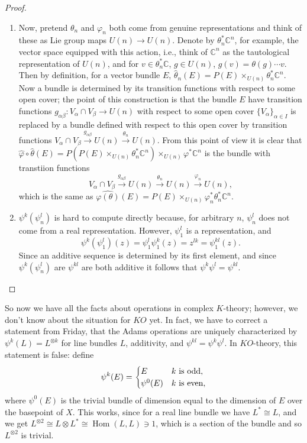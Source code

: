 \documentclass{article}
\newcommand{\C}{\mathbb{C}}
\DeclareMathOperator{\Hom}{Hom}
\begin{document}
\begin{proof}
\begin{enumerate}
\item Now, pretend $\theta_n$ and $\varphi_n$ both come from genuine representations and think of these as Lie group maps $U(n) \to U(n)$.  Denote by $\theta_n^* \C^n$, for example, the vector space equipped with this action, i.e., think of $\C^n$ as the tautological representation of $U(n)$, and for $v \in \theta_n^* \C$, $g \in U(n)$, $g(v) = \theta(g) \cdots v$.  Then by definition, for a vector bundle $E$, $\hat \theta_n(E) = P(E) \times_{U(n)} \theta_n^* \C^n$.  Now a bundle is determined by its transition functions with respect to some open cover; the point of this construction is that the bundle $E$ have transition functions $g_{\alpha \beta}: V_\alpha \cap V_\beta \to U(n)$ with respect to some open cover $\{V_\alpha\}_{\alpha \in I}$ is replaced by a bundle defined with respect to this open cover by transition functions $V_\alpha \cap V_\beta \stackrel{g_{\alpha \beta}}{\to} U(n) \stackrel{\theta_n}{\to} U(n)$.  From this point of view it is clear that $\hat \varphi \circ \hat \theta(E) = P(P(E) \times_{U(n)} \theta^*_n \C^n) \times_{U(n)} \varphi^* \C^n$ is the bundle with transtiion functions \[V_\alpha \cap V_\beta \stackrel{g_{\alpha \beta}}{\to} U(n) \stackrel{\theta_n}{\to} U(n) \stackrel{\varphi_n}{\to} U(n),\] which is the same as $\widehat{\varphi(\theta)} (E) = P(E) \times_{U(n)} \varphi^*_n \theta^*_n \C^n$.
\item $\psi^k(\psi^l_n)$ is hard to compute directly because, for arbitrary $n$, $\psi^l_n$ does not come from a real representation.  However, $\psi^l_1$ is a representation, and \[\psi^k(\psi^l_1)(z) = \psi^l_1 \psi^k_1(z) = z^{lk} = \psi^{kl}_1(z).\]  Since an additive sequence is determined by its first element, and since $\psi^k(\psi^l_n)$ are $\psi^{kl}$ are both additive it follows that $\psi^k \psi^l = \psi^{kl}$.
\end{enumerate}
\end{proof}

So now we have all the facts about operations in complex $K$-theory; however, we don't know about the situation for $KO$ yet.  In fact, we have to correct a statement from Friday, that the Adams operations are uniquely characterized by $\psi^k(L) = L^{\otimes k}$ for line bundles $L$, additivity, and $\psi^{kl} = \psi^k \psi^l$.  In $KO$-theory, this statement is false: define \[\psi^k(E) = \begin{cases} E & \hbox{$k$ is odd}, \\ \psi^0(E) & \hbox{$k$ is even}, \end{cases}\] where $\psi^0(E)$ is the trivial bundle of dimension equal to the dimension of $E$ over the basepoint of $X$.  This works, since for a real line bundle we have $L^* \cong L$, and we get $L^{\otimes 2} \cong L \otimes L^* \cong \Hom(L, L) \ni 1$, which is a section of the bundle and so $L^{\otimes 2}$ is trivial.
\end{document}
